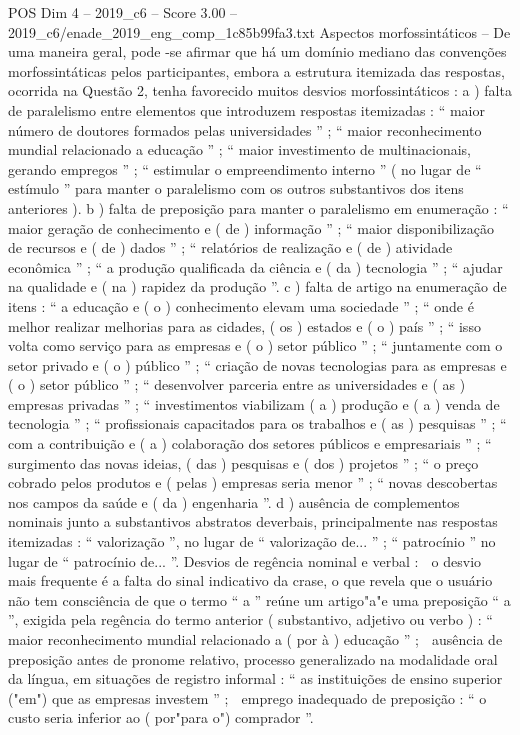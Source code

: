 \begin{textsample}{POS Dim 4 – 2019\_c6 – Score 3.00 – 2019\_c6/enade\_2019\_eng\_comp\_1c85b99fa3.txt}
Aspectos morfossintáticos – De uma maneira geral, pode -se afirmar que há um domínio mediano das convenções morfossintáticas pelos participantes, embora a estrutura itemizada das respostas, ocorrida na Questão 2, tenha favorecido muitos desvios morfossintáticos : a ) falta de paralelismo entre elementos que introduzem respostas itemizadas : “ maior número de doutores formados pelas universidades ” ; “ maior reconhecimento mundial relacionado a educação ” ; “ maior investimento de multinacionais, gerando empregos ” ; “ estimular o empreendimento interno ” ( no lugar de “ estímulo ” para manter o paralelismo com os outros substantivos dos itens anteriores ). b ) falta de preposição para manter o paralelismo em enumeração : “ maior geração de conhecimento e ( de ) informação ” ; “ maior disponibilização de recursos e ( de ) dados ” ; “ relatórios de realização e ( de ) atividade econômica ” ; “ a produção qualificada da ciência e ( da ) tecnologia ” ; “ ajudar na qualidade e ( na ) rapidez da produção ”. c ) falta de artigo na enumeração de itens : “ a educação e ( o ) conhecimento elevam uma sociedade ” ; “ onde é melhor realizar melhorias para as cidades, ( os ) estados e ( o ) país ” ; “ isso volta como serviço para as empresas e ( o ) setor público ” ; “ juntamente com o setor privado e ( o ) público ” ; “ criação de novas tecnologias para as empresas e ( o ) setor público ” ; “ desenvolver parceria entre as universidades e ( as ) empresas privadas ” ; “ investimentos viabilizam ( a ) produção e ( a ) venda de tecnologia ” ; “ profissionais capacitados para os trabalhos e ( as ) pesquisas ” ; “ com a contribuição e ( a ) colaboração dos setores públicos e empresariais ” ; “ surgimento das novas ideias, ( das ) pesquisas e ( dos ) projetos ” ; “ o preço cobrado pelos produtos e ( pelas ) empresas seria menor ” ; “ novas descobertas nos campos da saúde e ( da ) engenharia ”. d ) ausência de complementos nominais junto a substantivos abstratos deverbais, principalmente nas respostas itemizadas : “ valorização ”, no lugar de “ valorização de... ” ; “ patrocínio ” no lugar de “ patrocínio de... ”.
Desvios de regência nominal e verbal :  o desvio mais frequente é a falta do sinal indicativo da crase, o que revela que o usuário não tem consciência de que o termo “ a ” reúne um artigo"a"e uma preposição “ a ”, exigida pela regência do termo anterior ( substantivo, adjetivo ou verbo ) : “ maior reconhecimento mundial relacionado a ( por à ) educação ” ;  ausência de preposição antes de pronome relativo, processo generalizado na modalidade oral da língua, em situações de registro informal : “ as instituições de ensino superior ("em") que as empresas investem ” ;  emprego inadequado de preposição : “ o custo seria inferior ao ( por"para o") comprador ”.

\end{textsample}
